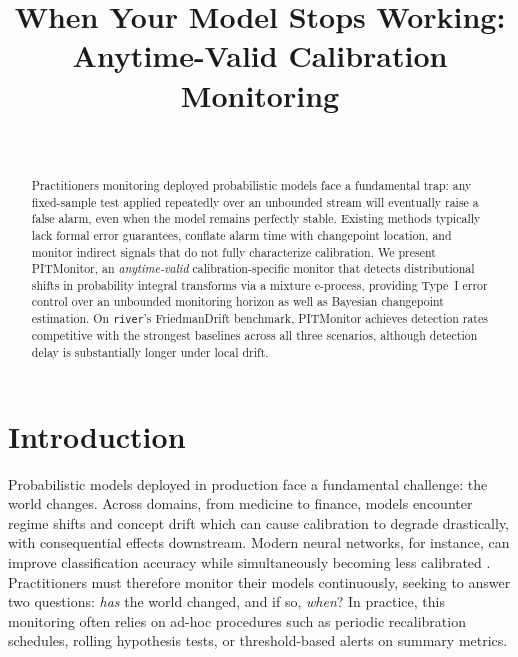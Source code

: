 \documentclass[ejsv2, noshowframe]{imsart}
\theoremstyle{plain}
\theoremstyle{definition}
\theoremstyle{remark}
\begin{document}
\begin{frontmatter}

\title{When Your Model Stops Working:\\ Anytime-Valid Calibration Monitoring}

\begin{aug}
\author[A]{~}
\address[A]{University of Amsterdam, }
\end{aug}

\begin{abstract}
Practitioners monitoring deployed probabilistic models face a fundamental trap: any fixed-sample test applied repeatedly over an unbounded stream will eventually raise a false alarm, even when the model remains perfectly stable. Existing methods typically lack formal error guarantees, conflate alarm time with changepoint location, and monitor indirect signals that do not fully characterize calibration. We present PITMonitor, an \emph{anytime-valid} calibration-specific monitor that detects distributional shifts in probability integral transforms via a mixture e-process, providing Type~I error control over an unbounded monitoring horizon as well as Bayesian changepoint estimation. On \texttt{river}'s FriedmanDrift benchmark, PITMonitor achieves detection rates competitive with the strongest baselines across all three scenarios, although detection delay is substantially longer under local drift.
\end{abstract}

\begin{keyword}
\end{keyword}

\end{frontmatter}

\section{Introduction}

Probabilistic models deployed in production face a fundamental challenge: the world changes. Across domains, from medicine to finance, models encounter regime shifts and concept drift which can cause calibration to degrade drastically, with consequential effects downstream. Modern neural networks, for instance, can improve classification accuracy while simultaneously becoming less calibrated \citep{guo2017calibration}. Practitioners must therefore monitor their models continuously, seeking to answer two questions: \emph{has} the world changed, and if so, \emph{when}? In practice, this monitoring often relies on ad-hoc procedures such as periodic recalibration schedules, rolling hypothesis tests, or threshold-based alerts on summary metrics.
\end{document}
